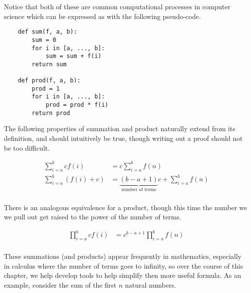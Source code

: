 \documentclass[twoside]{report}
\begin{document}
Notice that both of these are common computational processes in computer science which can be expressed as with the following pseudo-code.

\vspace{\baselineskip}
\begin{lstlisting}
	def sum(f, a, b):
		sum = 0
		for i in [a, ..., b]:
			sum = sum + f(i)
		return sum
		
	def prod(f, a, b):
		prod = 1
		for i in [a, ..., b]:
			prod = prod * f(i)
		return prod
\end{lstlisting}

The following properties of summation and product naturally extend from its definition, and should intuitively be true, though writing out a proof should not be too difficult.

\begin{align*}
	\sum_{i = a}^b cf(i) &= c \sum_{i = a}^b f(n) \\
	\sum_{i = a}^b (f(i) + c) &= \underbrace{(b - a + 1)}_\text{number of terms}c + \sum_{i = a}^b f(n) \\
\end{align*}

There is an analogous equivalence for a product, though this time the number we we pull out get raised to the power of the number of terms.

\begin{align*}
	\prod_{i = a}^b cf(i) &= c^{b - a + 1} \prod_{i = a}^b f(n) \\
\end{align*}

These summations (and products) appear frequently in mathematics, especially in calculus where the number of terms goes to infinity, so over the course of this chapter, we help develop tools to help simplify then more useful formula. As an example, consider the sum of the first $n$ natural numbers.
\end{document}
